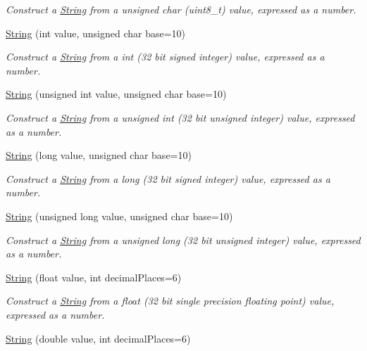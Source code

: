 \begin{DoxyCompactItemize}
\begin{DoxyCompactList}\small\item\em Construct a \hyperlink{class_string}{String} from a unsigned char (uint8\+\_\+t) value, expressed as a number. \end{DoxyCompactList}\item 
\hyperlink{class_string_a5528e1c6d322a9ee21f155c291ea67d1}{String} (int value, unsigned char base=10)
\begin{DoxyCompactList}\small\item\em Construct a \hyperlink{class_string}{String} from a int (32 bit signed integer) value, expressed as a number. \end{DoxyCompactList}\item 
\hyperlink{class_string_a53134e2b38eb0d114f886e807a3753ae}{String} (unsigned int value, unsigned char base=10)
\begin{DoxyCompactList}\small\item\em Construct a \hyperlink{class_string}{String} from a unsigned int (32 bit unsigned integer) value, expressed as a number. \end{DoxyCompactList}\item 
\hyperlink{class_string_a868687056546919b7109c0801d75ec83}{String} (long value, unsigned char base=10)
\begin{DoxyCompactList}\small\item\em Construct a \hyperlink{class_string}{String} from a long (32 bit signed integer) value, expressed as a number. \end{DoxyCompactList}\item 
\hyperlink{class_string_abdad234c756b44cce55c75db24fddecf}{String} (unsigned long value, unsigned char base=10)
\begin{DoxyCompactList}\small\item\em Construct a \hyperlink{class_string}{String} from a unsigned long (32 bit unsigned integer) value, expressed as a number. \end{DoxyCompactList}\item 
\hyperlink{class_string_adef4f199739444a78803c4043ad3e228}{String} (float value, int decimal\+Places=6)
\begin{DoxyCompactList}\small\item\em Construct a \hyperlink{class_string}{String} from a float (32 bit single precision floating point) value, expressed as a number. \end{DoxyCompactList}\item 
\hyperlink{class_string_a46e13b4608fbe763b4fc5bf22362078e}{String} (double value, int decimal\+Places=6)

\end{DoxyCompactItemize}
